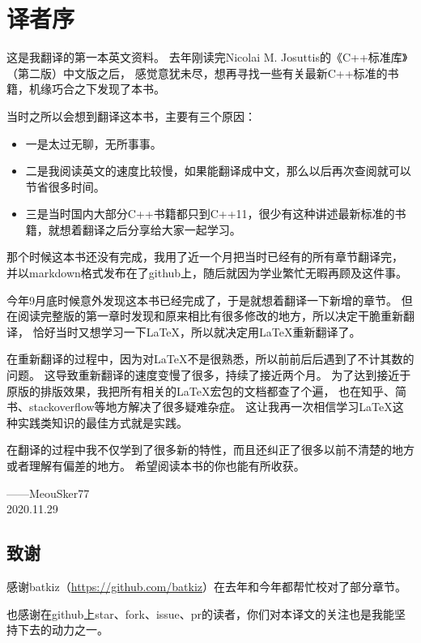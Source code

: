 \chapter{译者序}
这是我翻译的第一本英文资料。
去年刚读完Nicolai M. Josuttis的《C++标准库》（第二版）中文版之后，
感觉意犹未尽，想再寻找一些有关最新C++标准的书籍，机缘巧合之下发现了本书。

当时之所以会想到翻译这本书，主要有三个原因：
\begin{itemize}
    \item 一是太过无聊，无所事事。
    \item 二是我阅读英文的速度比较慢，如果能翻译成中文，那么以后再次查阅就可以节省很多时间。
    \item 三是当时国内大部分C++书籍都只到C++11，很少有这种讲述最新标准的书籍，就想着翻译之后分享给大家一起学习。
\end{itemize}

那个时候这本书还没有完成，我用了近一个月把当时已经有的所有章节翻译完，
并以markdown格式发布在了github上，随后就因为学业繁忙无暇再顾及这件事。

今年9月底时候意外发现这本书已经完成了，于是就想着翻译一下新增的章节。
但在阅读完整版的第一章时发现和原来相比有很多修改的地方，所以决定干脆重新翻译，
恰好当时又想学习一下\LaTeX，所以就决定用\LaTeX 重新翻译了。

在重新翻译的过程中，因为对\LaTeX 不是很熟悉，所以前前后后遇到了不计其数的问题。
这导致重新翻译的速度变慢了很多，持续了接近两个月。
为了达到接近于原版的排版效果，我把所有相关的\LaTeX 宏包的文档都查了个遍，
也在知乎、简书、stackoverflow等地方解决了很多疑难杂症。
这让我再一次相信学习\LaTeX 这种实践类知识的最佳方式就是实践。

在翻译的过程中我不仅学到了很多新的特性，而且还纠正了很多以前不清楚的地方或者理解有偏差的地方。
希望阅读本书的你也能有所收获。

\begin{flushright}
    ——MeouSker77\\
    2020.11.29
\end{flushright}


\section{致谢}
感谢batkiz（\url{https://github.com/batkiz}）在去年和今年都帮忙校对了部分章节。

也感谢在github上star、fork、issue、pr的读者，你们对本译文的关注也是我能坚持下去的动力之一。
